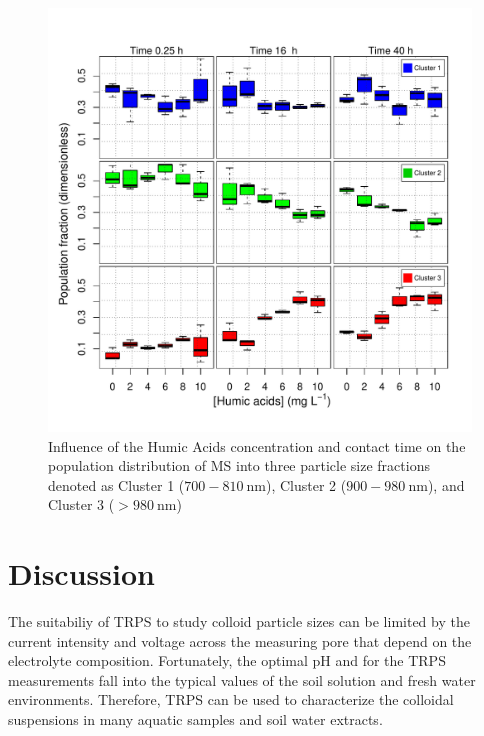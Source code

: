 \documentclass[journal=langd5,manuscript=article]{achemso}
\begin{document}
\begin{figure}
 \includegraphics[width=\linewidth]{Figures/Boxplot_MS_HA_CaCl2_populations.pdf}
  \caption{Influence of the Humic Acids concentration and contact time on the population distribution of MS into three particle size fractions denoted as
  Cluster 1 ($700 - 810~\mathrm{nm}$),  Cluster 2 ($900 - 980~\mathrm{nm}$), 
  and
  Cluster 3 ($ > 980~\mathrm{nm}$)
  }
  \label{fgr:boxplot_populations}
\end{figure}






\section{Discussion}


%
The suitabiliy of TRPS to study colloid particle sizes
can be limited by the current intensity and voltage across the measuring pore that depend on the electrolyte composition.
Fortunately, the optimal pH and \ce{[Ca^{2+}]} for the TRPS measurements fall into the
typical values of the
soil solution\cite{wolt1994soil}
and  fresh water environments\cite{Stumm1993}.
Therefore, TRPS can be used to characterize the colloidal suspensions in many  aquatic samples and soil water extracts.
\end{document}
